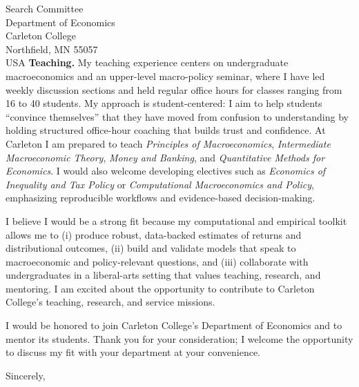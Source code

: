 \documentclass[11pt,letterpaper]{letter}
\begin{document}
\begin{letter}{Search Committee \\
Department of Economics \\
Carleton College \\
Northfield, MN 55057 \\ USA}
\textbf{Teaching.} My teaching experience centers on undergraduate macroeconomics and an upper-level macro-policy seminar, where I have led weekly discussion sections and held regular office hours for classes ranging from 16 to 40 students. My approach is student-centered: I aim to help students “convince themselves” that they have moved from confusion to understanding by holding structured office-hour coaching that builds trust and confidence. At Carleton I am prepared to teach \textit{Principles of Macroeconomics}, \textit{Intermediate Macroeconomic Theory}, \textit{Money and Banking}, and \textit{Quantitative Methods for Economics}. I would also welcome developing electives such as \textit{Economics of Inequality and Tax Policy} or \textit{Computational Macroeconomics and Policy}, emphasizing reproducible workflows and evidence-based decision-making.

I believe I would be a strong fit because my computational and empirical toolkit allows me to (i) produce robust, data-backed estimates of returns and distributional outcomes, (ii) build and validate models that speak to macroeconomic and policy-relevant questions, and (iii) collaborate with undergraduates in a liberal-arts setting that values teaching, research, and mentoring. I am excited about the opportunity to contribute to Carleton College’s teaching, research, and service missions.

I would be honored to join Carleton College’s Department of Economics and to mentor its students. Thank you for your consideration; I welcome the opportunity to discuss my fit with your department at your convenience.

\closing{Sincerely,}

\end{letter}
\end{document}
